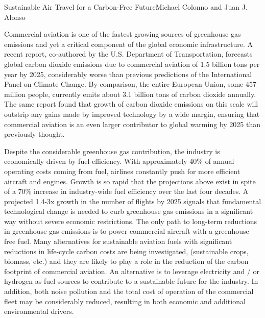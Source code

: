 \documentclass{papertex}
\begin{document}
\begin{news}{2}{Sustainable Air Travel for a Carbon-Free Future}{Michael Colonno and Juan J. Alonso}{}{}

Commercial aviation is one of the fastest growing sources of greenhouse gas 
emissions and yet a critical component of the global economic infrastructure. 
A recent report, co-authored by the U.S. Department of Transportation, 
forecasts global carbon dioxide emissions due to commercial aviation of 1.5 
billion tons per year by 2025, considerably worse than previous predictions of 
the International Panel on Climate Change. By comparison, the entire European 
Union, some 457 million people, currently emits about 3.1 billion tons of 
carbon dioxide annually. The same report found that growth of carbon dioxide 
emissions on this scale will outstrip any gains made by improved technology 
by a wide margin, ensuring that commercial aviation is an even larger 
contributor to global warming by 2025 than previously thought.

Despite the considerable greenhouse gas contribution, the industry is 
economically driven by fuel efficiency. With approximately 40\% of annual 
operating costs coming from fuel, airlines constantly push for more efficient 
aircraft and engines. Growth is so rapid that the projections above exist in 
spite of a 70\% increase in industry-wide fuel efficiency over the last four 
decades. A projected 1.4-3x growth in the number of flights by 2025 signals 
that fundamental technological change is needed to curb greenhouse gas 
emissions in a significant way without severe economic restrictions. The only 
path to long-term reductions in greenhouse gas emissions is to power commercial 
aircraft with a greenhouse-free fuel. Many alternatives for sustainable 
aviation fuels with significant reductions in life-cycle carbon costs are 
being investigated, (sustainable crops, biomass, etc.) and they are likely to 
play a role in the reduction of the carbon footprint of commercial aviation. 
An alternative is to leverage electricity and / or hydrogen as fuel sources 
to contribute to a sustainable future for the industry. In addition, both 
noise pollution and the total cost of operation of the commercial fleet may 
be considerably reduced, resulting in both economic and additional 
environmental drivers.


\end{news}
\end{document}
